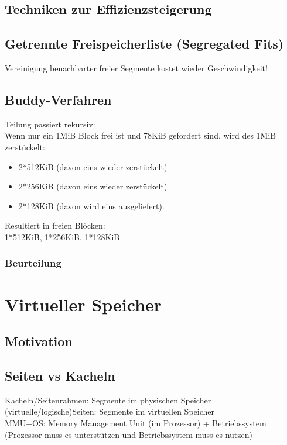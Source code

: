 \subsection{Techniken zur Effizienzsteigerung}
\subsection{Getrennte Freispeicherliste (Segregated Fits)}
Vereinigung benachbarter freier Segmente kostet wieder Geschwindigkeit!
\subsection{Buddy-Verfahren}
Teilung passiert rekursiv:\\
Wenn nur ein 1MiB Block frei ist und 78KiB gefordert sind, wird des 1MiB zerstückelt:
\begin{itemize}
\item 2*512KiB (davon eins wieder zerstückelt)
\item 2*256KiB (davon eins wieder zerstückelt)
\item 2*128KiB (davon wird eins ausgeliefert).
\end{itemize}
Resultiert in freien Blöcken:\\
1*512KiB, 1*256KiB, 1*128KiB
\subsubsection*{Beurteilung}

\section{Virtueller Speicher}
\subsection{Motivation}
\subsection{Seiten vs Kacheln}
Kacheln/Seitenrahmen: Segmente im physischen Speicher\\
(virtuelle/logische)Seiten: Segmente im virtuellen Speicher\\
MMU+OS: Memory Management Unit (im Prozessor) + Betriebssystem (Prozessor muss es unterstützen und Betriebssystem muss es nutzen)
